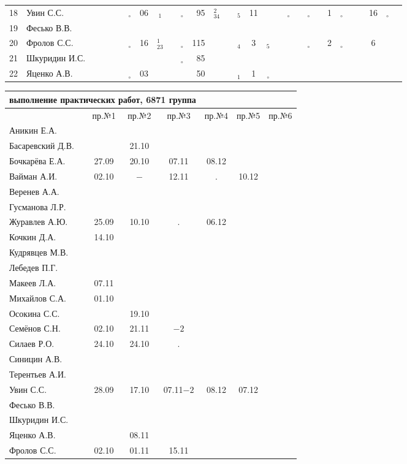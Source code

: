 \documentclass[a4paper,landscape,11pt]{article}
\newcommand*\OK{&\small \ding{51}$\!\!_\circ$} %
\newcommand*\Ok{&\small \ding{51}$\!\!_\circ$} %
\newcommand*\ok{&{\small \ding{51}}} %
\newcommand*\no{&{\small }} %
\newcommand*\da{&{\small\ding{48}$\!\!_1$}} %
\newcommand*\ac{&{\small\ding{48}$\!\!^1_{23}$}} %
\newcommand*\dd{&{\small\ding{48}$\!\!_4$}} %
\newcommand*\bd{&{\small\ding{48}$\!\!^2_{34}$}} %
\newcommand*\de{&{\small\ding{48}$\!\!_5$}} %
\begin{document}
\begin{tabular}{l|l|cccccccccrccccccccccccccccc}
18&Увин С.С.       \ok\ok\ok\ok\OK&06\da\ok\OK& 95\bd\ok\de& 11\ok\ok\Ok\ok\Ok\ok& 1\Ok\ok\ok&16\Ok\ok\\
19&Фесько В.В.     \no\no\no\no\no\no\no\no\no \no\no\no\no \no\no\no\no\no\no\no\no\no\no\no\no\no\no\\
20&Фролов С.С.     \ok\ok\ok\ok\OK&16\ac\ok\OK&115\ok\ok\dd&  3\de\ok\ok\ok\Ok\no& 2\Ok\ok\ok& 6\ok\ok\\ 
21&Шкуридин И.С.   \ok\ok\ok\ok\ok\no\ok\ok\OK& 85\ok\ok\no \no\ok\no\no\no\no\ok\no\no\no\no\no\no\no\\
22&Яценко А.В.     \ok\ok\ok\ok\OK&03\ok\ok\ok& 50\ok\ok\da&  1\Ok\no\no\no\no\ok\no\no\no\no\no\no\no\\ 
\bottomrule
\end{tabular} 
\newpage

\begin{tabular}{l|cccccc}
\multicolumn{4}{c}{выполнение практических работ, 6871 группа} \\
\toprule
                &пр.№1&пр.№2&пр.№3&пр.№4&пр.№5&  пр.№6\\
\midrule
Аникин Е.А.     &     &     &     &     &     &\\    
Басаревский Д.В.&     &21.10&     &     &     &\\
Бочкарёва Е.А.  &27.09&20.10&07.11&08.12&     &\\
Вайман А.И.     &02.10&$-$  &12.11&  .  &10.12&\\
Веренев А.А.    &     &     &     &     &     &\\
Гусманова Л.Р.  &     &     &     &     &     &\\
Журавлев А.Ю.   &25.09&10.10&  .  &06.12&     &\\
Кочкин Д.А.     &14.10&     &     &     &     &\\
Кудрявцев М.В.  &     &     &     &     &     &\\
Лебедев П.Г.    &     &     &     &     &     &\\
Макеев Л.А.     &07.11&     &     &     &     &\\
Михайлов С.А.   &01.10&     &     &     &     &\\
Осокина С.С.    &     &19.10&     &     &     &\\
Семёнов С.Н.    &02.10&21.11&$-2 $&     &     &\\
Силаев Р.О.     &24.10&24.10&  .  &     &     &\\
Синицин А.В.    &     &     &     &     &     &\\
Терентьев А.И.  &     &     &     &     &     &\\
Увин С.С.       &28.09&17.10&07.11$-2$&08.12&07.12&\\
Фесько В.В.     &     &     &     &     &     &\\
Шкуридин И.С.   &     &     &     &     &     &\\
Яценко А.В.     &     &08.11&     &     &     &\\
Фролов С.С.     &02.10&01.11&15.11&     &     &\\
\bottomrule
\end{tabular}
\end{document}
